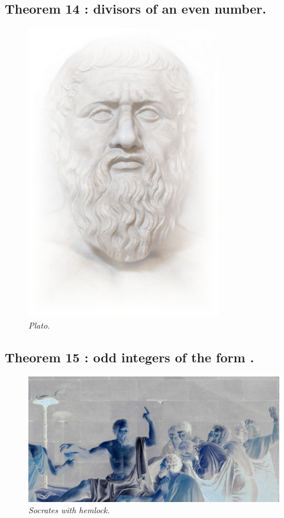 \documentclass[preview]{standalone}
\begin{document}
\subsection[Divisors of an even number.]{\color{section} Theorem 14 \color{black} : divisors of an even number.}

\begin{figure}[h!]
    \centering
    \includegraphics[width=8.5cm]{../resources/jpg/1.6.introduction.to.proofs/plato.jpg}
    \caption*{\emph{Plato.}}
\end{figure}
\pagebreak


\subsection[\texorpdfstring{Odd integers of the form $\zeta ^3 + 5$.}
    {Odd integers of the form zeta cubed + 5.}
    ]{
        \color{section} Theorem 15 \color{black} : odd integers of the form .
    }

\begin{figure}[h!]
    \centering
    \includegraphics[width=13.25cm]{../resources/jpg/1.6.introduction.to.proofs/socrates.jpg}
    \caption*{\emph{Socrates with hemlock.}}
\end{figure}
\end{document}
